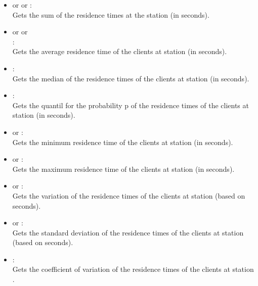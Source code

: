 \begin{itemize}

\item {} or  or :\\
Gets the sum of the residence times at the station  (in seconds).

\item
{} or  or\\ :\\
Gets the average residence time of the clients at station  (in seconds).

\item
{}:\\
Gets the median of the residence times of the clients at station  (in seconds).

\item
{}:\\
Gets the quantil for the probability p of the residence times of the clients at station  (in seconds).

\item
{} or :\\  
Gets the minimum residence time of the clients at station  (in seconds).

\item
{} or :\\
Gets the maximum residence time of the clients at station  (in seconds).

\item
{} or :\\
Gets the variation of the residence times of the clients at station  (based on seconds).

\item
{} or :\\
Gets the standard deviation of the residence times of the clients at station  (based on seconds).

\item
{}:\\
Gets the coefficient of variation of the residence times of the clients at station . 


\end{itemize}
